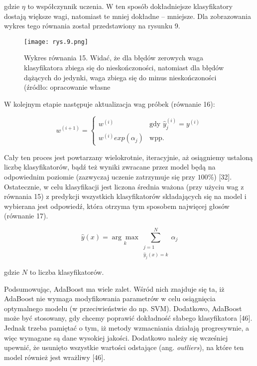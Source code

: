 \noindent gdzie $\eta$ to współczynnik uczenia. W ten sposób dokładniejsze klasyfikatory dostają 
większe wagi, natomiast te mniej dokładne – mniejsze. Dla zobrazowania wykres tego równania został przedstawiony na rysunku 9.

\begin{figure}[h]
    \centering
    \texttt{[image: rys.9.png]}
    \caption{Wykres równania 15. Widać, że dla błędów zerowych waga klasyfikatora zbiega się do nieskończoności, natomiast dla błędów dążących do jedynki, waga zbiega się do minus nieskończoności (źródło: opracowanie własne}
    \label{fig:mesh9}
\end{figure}

\noindent W kolejnym etapie następuje aktualizacja wag próbek (równanie 16):

\begin{equation}
w^{(i+1)} =
\begin{cases}
  w^{(i)} & \text{gdy } \hat {y}_j^{(i)} = y^{(i)}\\
  w^{(i)}exp(\alpha_j) & \text{wpp.}
\end{cases}
\end{equation}

\noindent  Cały ten proces jest powtarzany wielokrotnie, iteracyjnie, aż osiągniemy ustaloną liczbę klasyfikatorów, bądź też wyniki zwracane przez model będą na odpowiednim
poziomie (zazwyczaj uczenie zatrzymuje się przy $100\%$) [32]. Ostatecznie, w celu klasyfikacji jest liczona średnia ważona (przy użyciu wag z równania 15) z predykcji wszystkich klasyfikatorów składających się na model i wybierana jest odpowiedź, która otrzyma tym sposobem najwięcej głosów (równanie 17).

\begin{equation}
\hat y (x) = \underset{k}{\arg\max} \sum_{\substack{j=1 \\ \hat y_j(x)=k}}^N \alpha_j
\end{equation}

\noindent gdzie $N$ to liczba klasyfikatorów. 

Podsumowując, AdaBoost ma wiele zalet. Wśród nich znajduje się ta, iż AdaBoost nie wymaga modyfikowania parametrów w celu osiągnięcia optymalnego modelu (w przeciwieństwie do np. SVM). Dodatkowo, AdaBoost może być stosowany, gdy chcemy poprawić dokładność słabego klasyfikatora [46]. Jednak trzeba pamiętać o tym, iż metody wzmacniania działają progresywnie, a więc wymagane są dane wysokiej jakości. Dodatkowo należy się wcześniej upewnić, że usunięto wszystkie wartości odstające (ang. \textit{outliers}), na które ten model również jest wrażliwy [46]. 


